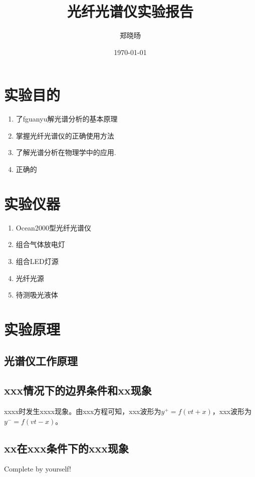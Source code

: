 \documentclass[UTF8]{ctexart}
\title{光纤光谱仪实验报告}
\author{郑晓旸}
\date{\today}
\begin{document}
\fancyfoot[C]{\thepage}

\maketitle
\tableofcontents
\newpage

\section{实验目的}
    \begin{enumerate}
            \item 了fguanyu解光谱分析的基本原理
            \item 掌握光纤光谱仪的正确使用方法
            \item 了解光谱分析在物理学中的应用.
            \item 正确的
    \end{enumerate} 


\section{实验仪器}
\begin{enumerate}
    \item Ocean2000型光纤光谱仪
    \item 组合气体放电灯
    \item 组合LED灯源
    \item 光纤光源
    \item 待测吸光液体
\end{enumerate}

\section{实验原理}

\subsection{光谱仪工作原理}


\subsection{xxx情况下的边界条件和xx现象}
xxxx时发生xxxx现象。由xxx方程可知，xxx波形为$y^+=f(vt+x)$，xxx波形为$y^-=f(vt-x)$。

\subsection{xx在xxx条件下的xxx现象}
Complete by yourself!
\end{document}
